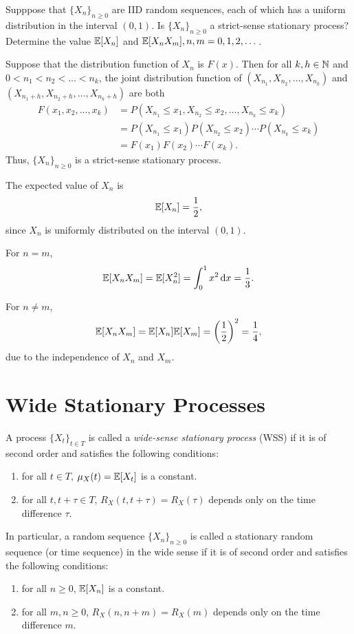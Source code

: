 \begin{example}
  Supppose that \(\{X_n\}_{n \geq 0}\) are IID random sequences, each of which has a uniform distribution in the interval \((0, 1)\). Is \(\{X_n\}_{n \geq 0}\) a strict-sense stationary process? Determine the value \(\mathbb{E}[X_n]\) and \(\mathbb{E}[X_n X_m], n, m = 0, 1, 2, \dots\).
\end{example}
\begin{solution}
  Suppose that the distribution function of \(X_n\) is \(F(x)\). Then for all \(k, h \in \mathbb{N}\) and \(0 < n_1 < n_2 < \dots < n_k\), the joint distribution function of \((X_{n_1}, X_{n_2}, \dots, X_{n_k})\) and \((X_{n_1 + h}, X_{n_2 + h}, \dots, X_{n_k + h})\) are both
  \begin{align*}
    F(x_1, x_2, \dots, x_k) &= P(X_{n_1} \leq x_1, X_{n_2} \leq x_2, \dots, X_{n_k} \leq x_k) \\
    &= P(X_{n_1} \leq x_1) P(X_{n_2} \leq x_2) \cdots P(X_{n_k} \leq x_k) \\
    &= F(x_1) F(x_2) \cdots F(x_k).
  \end{align*}
  Thus, \(\{X_n\}_{n \geq 0}\) is a strict-sense stationary process.

  The expected value of \(X_n\) is
  \[
    \mathbb{E}[X_n] = \frac{1}{2},
  \]
  since \(X_n\) is uniformly distributed on the interval \((0, 1)\).

  For \(n = m\),
  \[
    \mathbb{E}[X_n X_m] = \mathbb{E}[X_n^2] = \int_0^1 x^2 \, \mathrm{d} x = \frac{1}{3}.
  \]
  
  For \(n \neq m\),
  \[
    \mathbb{E}[X_n X_m] = \mathbb{E}[X_n] \mathbb{E}[X_m] = \left(\frac{1}{2}\right)^2 = \frac{1}{4},
  \]
  due to the independence of \(X_n\) and \(X_m\).
\end{solution}

\section{Wide Stationary Processes}

\begin{definition}
  A process \(\{X_t\}_{t \in T}\) is called a \emph{wide-sense stationary process} (WSS) if it is of second order and satisfies the following conditions:
  \begin{enumerate}
    \item for all \(t \in T\), \(\mu_X(t) = \mathbb{E}[X_t]\) is a constant.
    \item for all \(t, t + \tau \in T\), \(R_X(t, t + \tau) = R_X(\tau)\) depends only on the time difference \(\tau\).
  \end{enumerate}
  In particular, a random sequence \(\{X_n\}_{n \geq 0}\) is called a stationary random sequence (or time sequence) in the wide sense if it is of second order and satisfies the following conditions:
  \begin{enumerate}
    \item for all \(n \geq 0\), \(\mathbb{E}[X_n]\) is a constant.
    \item for all \(m, n \geq 0\), \(R_X(n, n + m) = R_X(m)\) depends only on the time difference \(m\).
  \end{enumerate}
\end{definition}

